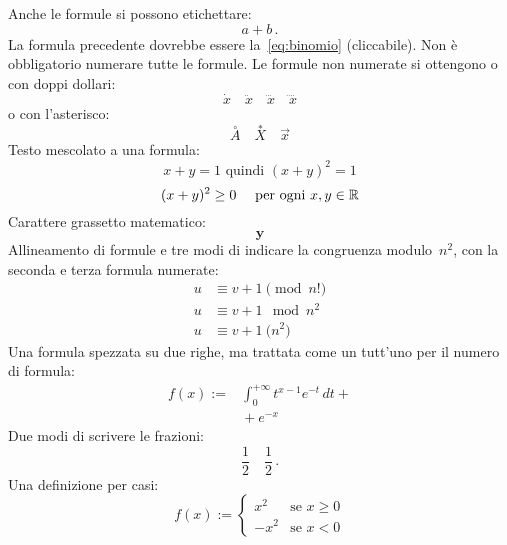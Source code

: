 Anche le formule si possono etichettare:
\begin{equation}
  \label{eq:binomio}
  a+b\,.
\end{equation}
La formula precedente dovrebbe essere la~\ref{eq:binomio} (cliccabile). Non \`e obbligatorio numerare tutte le formule. Le formule non numerate si ottengono o con doppi dollari:
$$\dot x\quad
  \ddot x\quad
  \dddot x\quad
  \ddddot x$$
o con l'asterisco:
\begin{equation*}
  \overset{\circ}{A}\quad
  \overset{*}{X}\quad
  \vec{x}
\end{equation*}
Testo mescolato a una formula:
\begin{equation}
  x+y=1\text{ quindi }(x+y)^2=1
\end{equation}
$$(x+y)^2\ge0\quad\text{ per ogni }x,y\in\mathbb{R}$$
Carattere grassetto matematico:
$$\boldsymbol{y}
  $$
Allineamento di formule e tre modi di indicare la congruenza modulo~$n^2$, con la seconda e terza formula numerate:
\begin{align}
     u & \equiv  v+1 \pmod{n!}\nonumber \\
     u & \equiv v+1 \mod{n^2} \\
     u & \equiv v+1 \pod{n^2}
  \end{align}
Una formula spezzata su due righe, ma trattata come un tutt'uno per il numero di formula:
\begin{equation}
  \begin{split}
    f(x)  :={}& \int_0^{+\infty}t^{x-1}e^{-t}\,dt+\\
         &{}+e^{-x}
  \end{split}
\end{equation}
Due modi di scrivere le frazioni:
\begin{equation}
  \frac{1}{2}
  \quad\frac{1}{2}\,.
  \end{equation}
Una definizione per casi:
\begin{equation}
  f(x):=
  \begin{cases}
    x^2 & \text{se } x\ge0 \\
   -x^2 & \text{se }x<0
  \end{cases}
\end{equation}
